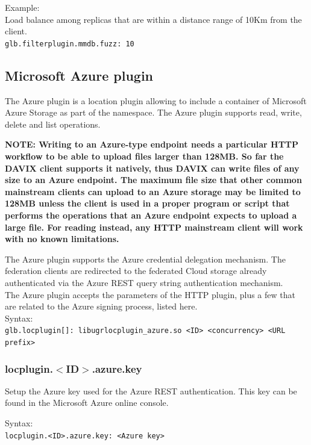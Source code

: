 \documentclass[12pt]{article} %
\begin{document}
Example:\\
Load balance among replicas that are within a distance range of 10Km from the client.\\
\lstinline"glb.filterplugin.mmdb.fuzz: 10"







\subsection{Microsoft Azure plugin}
The Azure plugin is a location plugin allowing to include a container of Microsoft Azure Storage as part of the namespace. The Azure plugin supports read,
write, delete and list operations.

\textbf{NOTE: Writing to an Azure-type endpoint needs a particular HTTP workflow to be able to upload files larger than 128MB. So far the DAVIX client supports it
natively, thus DAVIX can write files of any size to an Azure endpoint. The maximum file size that other common mainstream clients can upload to an Azure storage
may be limited to 128MB unless the client is used in a proper program or script that performs the operations that an Azure endpoint expects to upload a large file.
For reading instead, any HTTP mainstream client will work with no known limitations.}

The Azure plugin supports the Azure credential delegation mechanism. The federation clients are redirected to the federated Cloud storage already
authenticated via the Azure REST query string authentication mechanism.\\
The Azure plugin accepts the parameters of the HTTP plugin, plus a few that are related to the Azure signing process, listed here.\\

Syntax:\\
\lstinline"glb.locplugin[]: libugrlocplugin_azure.so <ID> <concurrency> <URL prefix>"\\

\subsubsection{locplugin.$<$ID$>$.azure.key}
Setup the Azure key used for the Azure REST authentication. This key can be found in the Microsoft Azure online console.

Syntax:\\
\lstinline"locplugin.<ID>.azure.key: <Azure key>"\\
\end{document}
